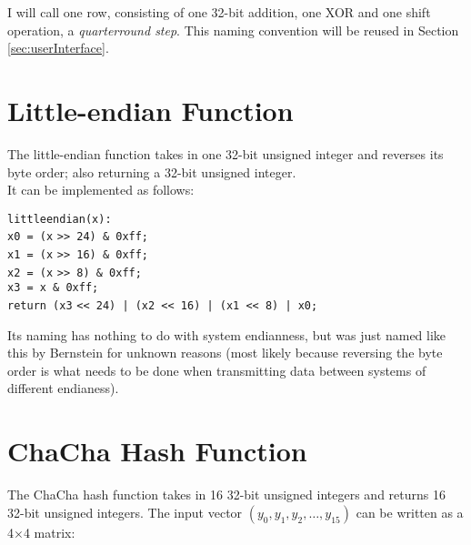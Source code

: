 I will call one row, consisting of one 32-bit addition, one XOR and one shift operation, a \textit{quarterround step}. This naming convention will be reused in Section \ref{sec:userInterface}.

\section{Little-endian Function}
\label{sec:chacha.littleendian}

The little-endian function takes in one 32-bit unsigned integer and reverses its byte order; also returning a 32-bit unsigned integer.  \\
It can be implemented as follows:

\begin{center}
\begin{minipage}{0.8\linewidth}
\texttt{littleendian(x):} \\
\hspace*{1em}\texttt{x0 = (x} \verb|>>|\texttt{ 24) \& 0xff;} \\
\hspace*{1em}\texttt{x1 = (x} \verb|>>|\texttt{ 16) \& 0xff;} \\
\hspace*{1em}\texttt{x2 = (x} \verb|>>|\texttt{ 8) \& 0xff;} \\
\hspace*{1em}\texttt{x3 = x \& 0xff;} \\
\hspace*{1em}\texttt{return (x3} \verb|<<|\texttt{ 24) | (x2 }\verb|<<|\texttt{ 16) | (x1 }\verb|<<|\texttt{ 8) | x0;}
\end{minipage}
\end{center}

\begin{remark}
Its naming has nothing to do with system endianness, but was just named like this by Bernstein for unknown reasons (most likely because reversing the byte order is what needs to be done when transmitting data between systems of different endianess).
\end{remark}

\section{ChaCha Hash Function}
\label{sec:chacha.hash}

The ChaCha hash function takes in 16 32-bit unsigned integers and returns 16 32-bit unsigned integers. The input vector $(y_0, y_1, y_2, \dots, y_{15})$ can be written as a 4$\times$4 matrix:

